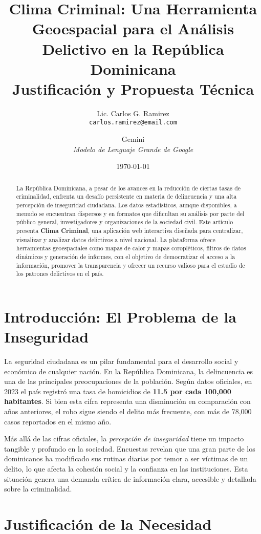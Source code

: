 \documentclass[12pt, a4paper]{article}
\title{
    {\huge Clima Criminal: Una Herramienta Geoespacial para el Análisis Delictivo en la República Dominicana} \\
    \vspace{0.5cm}
    \large Justificación y Propuesta Técnica
}
\author{
    Lic. Carlos G. Ramirez \\
    \texttt{carlos.ramirez@email.com} %
    \and
    Gemini \\
    \textit{Modelo de Lenguaje Grande de Google}
}
\date{\today}
\begin{document}
\maketitle

\begin{abstract}
La República Dominicana, a pesar de los avances en la reducción de ciertas tasas de criminalidad, enfrenta un desafío persistente en materia de delincuencia y una alta percepción de inseguridad ciudadana. Los datos estadísticos, aunque disponibles, a menudo se encuentran dispersos y en formatos que dificultan su análisis por parte del público general, investigadores y organizaciones de la sociedad civil. Este artículo presenta \textbf{Clima Criminal}, una aplicación web interactiva diseñada para centralizar, visualizar y analizar datos delictivos a nivel nacional. La plataforma ofrece herramientas geoespaciales como mapas de calor y mapas coropléticos, filtros de datos dinámicos y generación de informes, con el objetivo de democratizar el acceso a la información, promover la transparencia y ofrecer un recurso valioso para el estudio de los patrones delictivos en el país.
\end{abstract}

\section{Introducción: El Problema de la Inseguridad}

La seguridad ciudadana es un pilar fundamental para el desarrollo social y económico de cualquier nación. En la República Dominicana, la delincuencia es una de las principales preocupaciones de la población. Según datos oficiales, en 2023 el país registró una tasa de homicidios de \textbf{11.5 por cada 100,000 habitantes}. Si bien esta cifra representa una disminución en comparación con años anteriores, el robo sigue siendo el delito más frecuente, con más de 78,000 casos reportados en el mismo año.

Más allá de las cifras oficiales, la \textit{percepción de inseguridad} tiene un impacto tangible y profundo en la sociedad. Encuestas revelan que una gran parte de los dominicanos ha modificado sus rutinas diarias por temor a ser víctimas de un delito, lo que afecta la cohesión social y la confianza en las instituciones. Esta situación genera una demanda crítica de información clara, accesible y detallada sobre la criminalidad.

\section{Justificación de la Necesidad}
\end{document}
